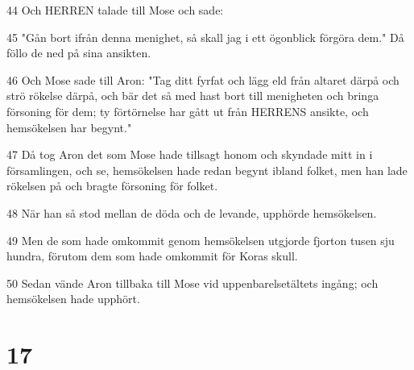 \par 44 Och HERREN talade till Mose och sade:
\par 45 "Gån bort ifrån denna menighet, så skall jag i ett ögonblick förgöra dem." Då föllo de ned på sina ansikten.
\par 46 Och Mose sade till Aron: "Tag ditt fyrfat och lägg eld från altaret därpå och strö rökelse därpå, och bär det så med hast bort till menigheten och bringa försoning för dem; ty förtörnelse har gått ut från HERRENS ansikte, och hemsökelsen har begynt."
\par 47 Då tog Aron det som Mose hade tillsagt honom och skyndade mitt in i församlingen, och se, hemsökelsen hade redan begynt ibland folket, men han lade rökelsen på och bragte försoning för folket.
\par 48 När han så stod mellan de döda och de levande, upphörde hemsökelsen.
\par 49 Men de som hade omkommit genom hemsökelsen utgjorde fjorton tusen sju hundra, förutom dem som hade omkommit för Koras skull.
\par 50 Sedan vände Aron tillbaka till Mose vid uppenbarelsetältets ingång; och hemsökelsen hade upphört.

\chapter{17}

